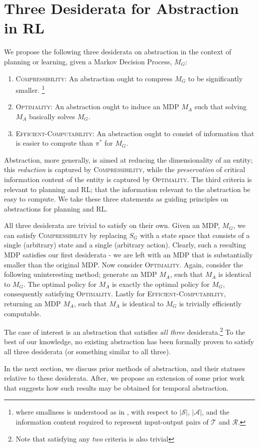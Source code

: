 \section{Three Desiderata for Abstraction in RL}

We propose the following three desiderata on abstraction in the context of planning or learning, given a Markov Decision Process, $M_G$:
\begin{enumerate}
\item \textsc{Compressibility}: An abstraction ought to compress $M_G$ to be significantly smaller. \footnote{where smallness is understood as in \cite{littman1995complexity}, with respect to $|\mathcal{S}|$, $|\mathcal{A}|$, and the information content required to represent input-output pairs of $\mathcal{T}$ and $\mathcal{R}$.}
\item \textsc{Optimality}: An abstraction ought to induce an MDP $M_A$ such that solving $M_A$ basically solves $M_G$.
\item \textsc{Efficient-Computability}: An abstraction ought to consist of information that is easier to compute than $\pi^*$ for $M_G$.
\end{enumerate}

Abstraction, more generally, is aimed at reducing the dimensionality of an entity; this {\it reduction} is captured by \textsc{Compressibility}, while the {\it preservation} of critical information content of the entity is captured by \textsc{Optimality}. The third criteria is relevant to planning and RL; that the information relevant to the abstraction be easy to compute. We take these three statements as guiding principles on abstractions for planning and \ac{RL}. 

All three desiderata are trivial to satisfy on their own. Given an \ac{MDP}, $M_G$, we can satisfy \textsc{Compressibility} by replacing $S_G$ with a state space that consists of a single (arbitrary) state and a single (arbitrary action). Clearly, such a resulting \ac{MDP} satisfies our first desiderata - we are left with an MDP that is substantially smaller than the original MDP. Now consider \textsc{Optimality}. Again, consider the following uninteresting method; generate an MDP $M_A$, such that $M_A$ is identical to $M_G$. The optimal policy for $M_A$ is exactly the optimal policy for $M_G$, consequently satisfying \textsc{Optimality}. Lastly for \textsc{Efficient-Computability}, returning an MDP $M_A$, such that $M_A$ is identical to $M_G$ is trivially efficiently computable.

The case of interest is an abstraction that satisfies {\it all three} desiderata.\footnote{Note that satisfying any {\it two} criteria is also trivial} To the best of our knowledge, no existing abstraction has been formally proven to satisfy all three desiderata (or something similar to all three).

In the next section, we discuss prior methods of abstraction, and their statuses relative to these desiderata. After, we propose an extension of some prior work that suggests how such results may be obtained for temporal abstraction.